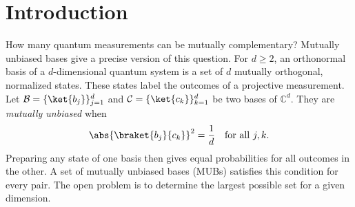 \begin{abstract}
Mutually unbiased bases describe quantum measurements for which certainty in one basis gives uniform outcomes in every other. Their maximum number is known when the dimension is a power of a prime number, but the smallest unresolved case, dimension six, has resisted both constructions and exclusion proofs for decades. Here we present a computer-assisted proof that this maximum is three. We use our complete classification of complex Hadamard matrices, which allowed a reconstruction based on four phases,   with exact Fourier identities and certified local exclusions. The maxima of a scalar function allow us to extend local exclusions throughout one part of the reconstruction. An exact identity forces the remaining candidates into the Fourier class, which is excluded. 
We also determine the phase regions occupied by the known triples and conjecture that a two-parameter construction and an isolated Fourier triple exhaust them. Dimension six thus attains the tensor product bound, even though constructions in dimension twelve exceed it. This fixes the number of exactly complementary projective measurements in a six-level system, while the classification of the triples remains open. 
\end{abstract}
\maketitle

\section{Introduction}
How many quantum measurements can be mutually complementary? Mutually unbiased bases give a precise version of this question. For $d\ge2$, an orthonormal basis of a $d$-dimensional quantum system is a set of $d$ mutually orthogonal, normalized states. These states label the outcomes of a projective measurement. Let $\mathcal B=\{\ket{b_j}\}_{j=1}^d$ and $\mathcal C=\{\ket{c_k}\}_{k=1}^d$ be two bases of $\mathbb{C}^d$. They are \textit{mutually unbiased} when
\begin{equation}
 \abs{\braket{b_j}{c_k}}^2=\frac1d
 \quad\text{for all }j,k.
 \label{eq:mub}
\end{equation}
Preparing any state of one basis then gives equal probabilities for all outcomes in the other. A set of mutually unbiased bases (MUBs) satisfies this condition for every pair. The open problem is to determine the largest possible set for a given dimension.

